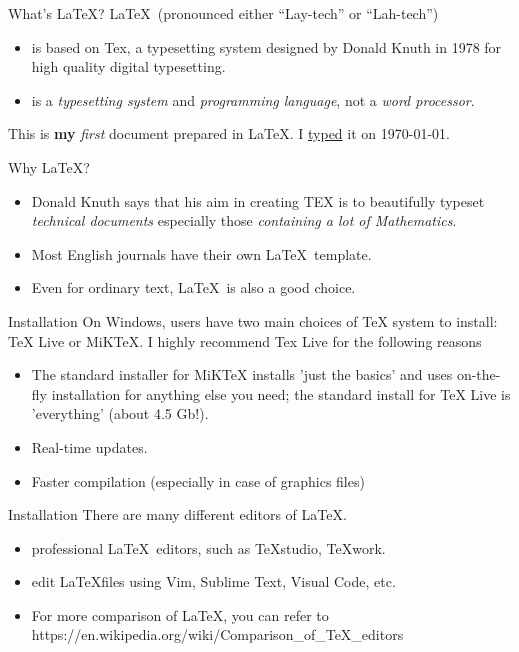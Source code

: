 \documentclass[11pt]{beamer}
\begin{document}
\begin{CJK*}{UTF8}{gkai}
\begin{frame}[fragile]{What's \LaTeX?}
\LaTeX\ (pronounced either “Lay-tech” or “Lah-tech”) 
	\begin{itemize}
		\item is based on Tex, a typesetting system designed by Donald Knuth in 1978 for high quality digital typesetting.
		\item is a \textit{typesetting system} and \textit{programming language}, not a \textit{word processor}.
	\end{itemize}

\vskip 0.25cm
\begin{LTXexample}[caption={the typesetting nature of \LaTeX}]
This is \textbf{my} \emph{first} document prepared in \LaTeX. I \underline{typed} it on \today.
\end{LTXexample} 
\end{frame}

\begin{frame}{Why \LaTeX?}
\begin{itemize}
	\item Donald Knuth says that his aim in creating TEX is to beautifully
	typeset \textit{technical documents} especially those \textit{containing a lot of Mathematics}.
	\item Most English journals have their own \LaTeX\ template.
	\item Even for ordinary text, \LaTeX\ is also a good choice.
\end{itemize}
\end{frame}

\begin{frame}{Installation}
	On Windows, users have two main choices of TeX system to install: \alert{TeX Live} or \alert{MiKTeX}. I highly recommend Tex Live for the following reasons
	\begin{itemize}
		\item The standard installer for MiKTeX installs 'just the basics' and uses on-the-fly installation for anything else you need; the standard install for TeX Live is 'everything' (about 4.5 Gb!).
		\item Real-time updates.
		\item Faster compilation (especially in case of graphics files)
	\end{itemize}
\end{frame}

\begin{frame}{Installation}
There are many different editors of \LaTeX.
\begin{itemize}
\item professional \LaTeX\ editors, such as TeXstudio, TeXwork.
\item edit \LaTeX files using Vim, Sublime Text, Visual Code, etc.
\item For more comparison of \LaTeX, you can refer to https://en.wikipedia.org/wiki/Comparison\_of\_TeX\_editors
\end{itemize}
 \vskip 0.75cm


\end{frame}
\end{CJK*}
\end{document}
